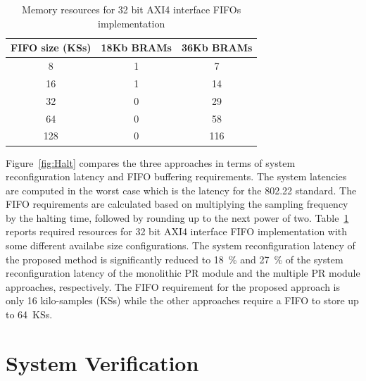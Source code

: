 \begin{table}[hb]
	\centering
	\caption{Memory resources for 32 bit AXI4 interface FIFOs implementation}
	\label{tab:FIFOResouces}
	\begin{tabular}{c|c|c}
        \hline \hline
    			  FIFO size (KSs)&  18Kb BRAMs  & 36Kb BRAMs \\
	\hline
		8			& 1	&  7 \\
		16			& 1	&  14  \\
		32			& 0 	&  29 \\
		64	  		& 0  & 58 \\
		128	  		& 0	 & 116 \\
	\hline \hline
    \end{tabular}
\end{table}
Figure~\ref{fig:Halt} compares the three approaches in terms of system reconfiguration latency and FIFO buffering requirements. The system latencies are computed in the worst case which is the latency for the 802.22 standard. The FIFO requirements are calculated based on multiplying the sampling frequency by the halting time, followed by rounding up to the next power of two.  Table~\ref{tab:FIFOResouces} reports
required resources for 32 bit AXI4 interface FIFO implementation with some different availabe size configurations.
The system reconfiguration latency of the proposed method is significantly reduced to 18~\% and 27~\% of the system reconfiguration latency of the monolithic PR module and the multiple PR module approaches, respectively. The FIFO requirement for the proposed approach is only 16 kilo-samples (KSs) while the other approaches require a FIFO to store up to 64~KSs.

\section{System Verification}
\label{sec:SysVer}

